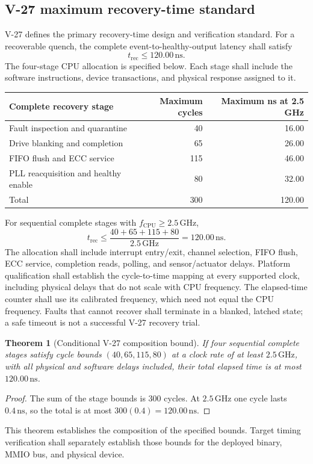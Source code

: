 \documentclass[11pt,a4paper]{article}
\newtheorem{theorem}{Theorem}[section]
\newcommand{\unit}[1]{\,\mathrm{#1}}
\begin{document}
\subsection{V-27 maximum recovery-time standard}
V-27 defines the primary recovery-time design and verification standard. For a
recoverable quench, the complete event-to-healthy-output latency shall satisfy
\begin{equation}
 t_{\mathrm{rec}}\le120.00\unit{ns}.
 \label{eq:recovery-standard}
\end{equation}
The four-stage CPU allocation is specified below. Each stage shall include the
software instructions, device transactions, and physical response assigned to it.
\begin{center}\small
\begin{tabular}{@{}lrr@{}}\toprule
Complete recovery stage & Maximum cycles & Maximum ns at 2.5 GHz\\\midrule
Fault inspection and quarantine & 40 & 16.00\\
Drive blanking and completion & 65 & 26.00\\
FIFO flush and ECC service & 115 & 46.00\\
PLL reacquisition and healthy enable & 80 & 32.00\\\midrule
Total & 300 & 120.00\\\bottomrule
\end{tabular}\end{center}
For sequential complete stages with $f_{\mathrm{CPU}}\ge2.5\unit{GHz}$,
\[
 t_{\mathrm{rec}}\le\frac{40+65+115+80}{2.5\unit{GHz}}
 =120.00\unit{ns}.
\]
The allocation shall include interrupt entry/exit, channel selection, FIFO flush,
ECC service, completion reads, polling, and sensor/actuator delays. Platform
qualification shall establish the cycle-to-time mapping at every supported clock,
including physical delays that do not scale with CPU frequency. The elapsed-time
counter shall use its calibrated frequency, which need not equal the CPU frequency.
Faults that cannot recover shall terminate in a blanked, latched state; a safe timeout
is not a successful V-27 recovery trial.
\begin{theorem}[Conditional V-27 composition bound]
If four sequential complete stages satisfy cycle bounds $(40,65,115,80)$ at a
clock rate of at least $2.5\unit{GHz}$, with all physical and software delays
included, their total elapsed time is at most $120.00\unit{ns}$.
\end{theorem}
\begin{proof}
The sum of the stage bounds is 300 cycles. At $2.5\unit{GHz}$ one cycle lasts
$0.4\unit{ns}$, so the total is at most $300(0.4)=120.00\unit{ns}$.
\end{proof}
This theorem establishes the composition of the specified bounds. Target timing
verification shall separately establish those bounds for the deployed binary,
MMIO bus, and physical device.
\end{document}
